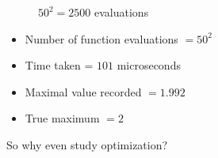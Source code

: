 \begin{frame}
    
    \begin{figure}
       \begin{center}
           \caption{$50^2 = 2500$ evaluations}
       \end{center}
    \end{figure}

\end{frame}


\begin{frame}
    
    \begin{itemize}
        \item Number of function evaluations $= 50^2$
        \item Time taken = $101$ microseconds
        \item Maximal value recorded $= 1.992$
        \item True maximum $= 2$
    \end{itemize}

    \vspace{1em}

    So why even study optimization?

\end{frame}


